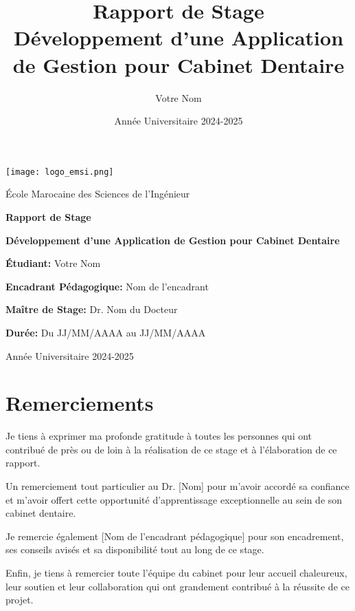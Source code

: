 \documentclass[12pt,a4paper]{report}
\title{\textbf{Rapport de Stage}\\[0.5cm]
Développement d'une Application de Gestion pour Cabinet Dentaire}
\author{Votre Nom}
\date{Année Universitaire 2024-2025}
\begin{document}
\begin{titlepage}
    \centering
    \vspace*{2cm}
    \texttt{[image: logo\_emsi.png]}\par\vspace{1cm}
    {\LARGE École Marocaine des Sciences de l'Ingénieur\par}
    \vspace{2cm}
    {\Huge\bfseries Rapport de Stage\par}
    \vspace{0.5cm}
    {\Large\bfseries Développement d'une Application de Gestion pour Cabinet Dentaire\par}
    \vspace{2cm}
    {\large \textbf{Étudiant:} Votre Nom\par}
    {\large \textbf{Encadrant Pédagogique:} Nom de l'encadrant\par}
    {\large \textbf{Maître de Stage:} Dr. Nom du Docteur\par}
    {\large \textbf{Durée:} Du JJ/MM/AAAA au JJ/MM/AAAA\par}
    \vfill
    {\large Année Universitaire 2024-2025\par}
\end{titlepage}

\tableofcontents
\thispagestyle{empty}
\cleardoublepage

\setcounter{page}{1}

\chapter*{Remerciements}

Je tiens à exprimer ma profonde gratitude à toutes les personnes qui ont contribué de près ou de loin à la réalisation de ce stage et à l'élaboration de ce rapport.\par

Un remerciement tout particulier au Dr. [Nom] pour m'avoir accordé sa confiance et m'avoir offert cette opportunité d'apprentissage exceptionnelle au sein de son cabinet dentaire.\par

Je remercie également [Nom de l'encadrant pédagogique] pour son encadrement, ses conseils avisés et sa disponibilité tout au long de ce stage.\par

Enfin, je tiens à remercier toute l'équipe du cabinet pour leur accueil chaleureux, leur soutien et leur collaboration qui ont grandement contribué à la réussite de ce projet.
\end{document}
